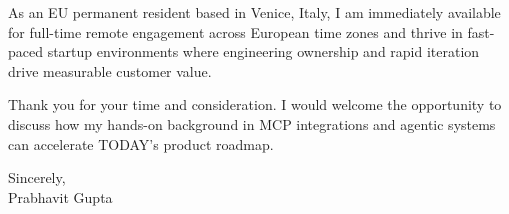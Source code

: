 \documentclass[11pt,a4paper]{letter}
\begin{document}
As an EU permanent resident based in Venice, Italy, I am immediately available for full-time remote engagement across European time zones and thrive in fast-paced startup environments where engineering ownership and rapid iteration drive measurable customer value.

Thank you for your time and consideration. I would welcome the opportunity to discuss how my hands-on background in MCP integrations and agentic systems can accelerate TODAY's product roadmap.

Sincerely,\\
Prabhavit Gupta
\end{document}
